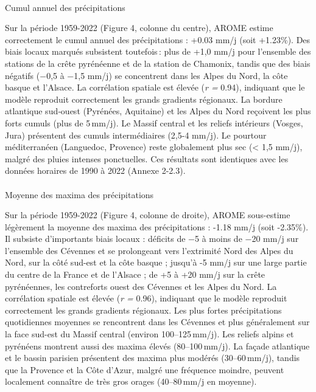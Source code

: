 \documentclass[
  article,
  nofooter,
  noheadings]{jss}
\makeatletter
\let\oldparagraph\paragraph
\renewcommand{\paragraph}{
    \@ifstar
      \xxxParagraphStar
      \xxxParagraphNoStar
  }
\newcommand{\xxxParagraphStar}[1]{\oldparagraph*{#1}\mbox{}}
\newcommand{\xxxParagraphNoStar}[1]{\oldparagraph{#1}\mbox{}}
\makeatother
\begin{document}

\paragraph{Cumul annuel des
précipitations}\label{cumul-annuel-des-pruxe9cipitations}

Sur la période 1959-2022 (Figure 4, colonne du centre), AROME estime
correctement le cumul annuel des précipitations : +0.03 mm/j (soit
+1.23\%). Des biais locaux marqués subsistent toutefois\,: plus de +1,0
mm/j pour l'ensemble des stations de la crête pyrénéenne et de la
station de Chamonix, tandis que des biais négatifs (−0,5 à −1,5 mm/j) se
concentrent dans les Alpes du Nord, la côte basque et l'Alsace. La
corrélation spatiale est élevée (\emph{r =} 0.94), indiquant que le
modèle reproduit correctement les grands gradients régionaux. La bordure
atlantique sud‑ouest (Pyrénées, Aquitaine) et les Alpes du Nord
reçoivent les plus forts cumuls (plus de 5\,mm/j). Le Massif central et
les reliefs intérieurs (Vosges, Jura) présentent des cumuls
intermédiaires (2,5-4 mm/j). Le pourtour méditerranéen (Languedoc,
Provence) reste globalement plus sec (\textless{} 1,5 mm/j), malgré des
pluies intenses ponctuelles. Ces résultats sont identiques avec les
données horaires de 1990 à 2022 (Annexe 2-2.3).

\paragraph{Moyenne des maxima des
précipitations}\label{moyenne-des-maxima-des-pruxe9cipitations}

Sur la période 1959-2022 (Figure 4, colonne de droite), AROME
sous-estime légèrement la moyenne des maxima des précipitations : -1.18
mm/j (soit -2.35\%). Il subsiste d'importants biais locaux : déficits de
−5 à moins de −20 mm/j sur l'ensemble des Cévennes et se prolongeant
vers l'extrimité Nord des Alpes du Nord, sur la côté sud-est et la côte
basque ; jusqu'à -5 mm/j sur une large partie du centre de la France et
de l'Alsace ; de +5 à +20 mm/j sur la crête pyrénéennes, les contreforts
ouest des Cévennes et les Alpes du Nord. La corrélation spatiale est
élevée (\emph{r =} 0.96), indiquant que le modèle reproduit correctement
les grands gradients régionaux. Les plus fortes précipitations
quotidiennes moyennes se rencontrent dans les Cévennes et plus
généralement sur la face sud-est du Massif central (environ
100--125\,mm/j). Les reliefs alpins et pyrénéens montrent aussi des
maxima élevés (80--100\,mm/j). La façade atlantique et le bassin
parisien présentent des maxima plus modérés (30--60\,mm/j), tandis que
la Provence et la Côte d'Azur, malgré une fréquence moindre, peuvent
localement connaître de très gros orages (40--80\,mm/j en moyenne).
\end{document}
